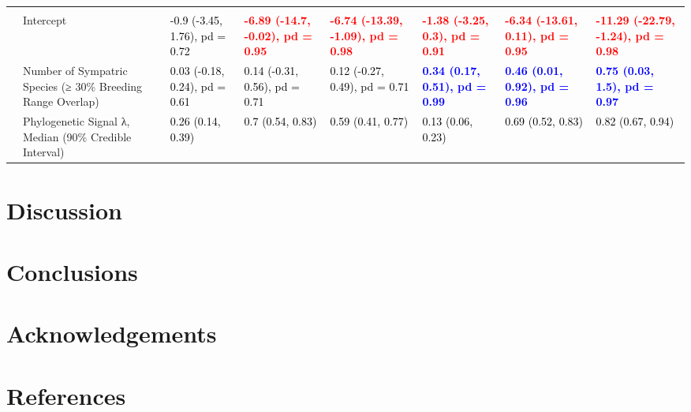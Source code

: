 \documentclass[
  a4paper,
]{article}
\begin{document}
\begin{landscape}
\begin{table}
{\begin{tabular}[t]{llllllll}
\addlinespace[0.3em]
\multicolumn{1}{l}{\textbf{Breeding Sympatry}}\\
\hspace{1em} & Intercept & \textcolor{black}{-0.9 (-3.45, 1.76), pd = 0.72} & \textcolor{red}{\textbf{-6.89 (-14.7, -0.02), pd = 0.95}} & \textcolor{red}{\textbf{-6.74 (-13.39, -1.09), pd = 0.98}} & \textcolor{red}{\textbf{-1.38 (-3.25, 0.3), pd = 0.91}} & \textcolor{red}{\textbf{-6.34 (-13.61, 0.11), pd = 0.95}} & \textcolor{red}{\textbf{-11.29 (-22.79, -1.24), pd = 0.98}}\\
 & Number of Sympatric Species 
\hspace{1em} (≥ 30\% Breeding Range Overlap) & \textcolor{black}{0.03 (-0.18, 0.24), pd = 0.61} & \textcolor{black}{0.14 (-0.31, 0.56), pd = 0.71} & \textcolor{black}{0.12 (-0.27, 0.49), pd = 0.71} & \textcolor{blue}{\textbf{0.34 (0.17, 0.51), pd = 0.99}} & \textcolor{blue}{\textbf{0.46 (0.01, 0.92), pd = 0.96}} & \textcolor{blue}{\textbf{0.75 (0.03, 1.5), pd = 0.97}}\\
\hspace{1em} & Phylogenetic Signal λ, Median (90\% Credible Interval) & \textcolor{black}{0.26 (0.14, 0.39)} & \textcolor{black}{0.7 (0.54, 0.83)} & \textcolor{black}{0.59 (0.41, 0.77)} & \textcolor{black}{0.13 (0.06, 0.23)} & \textcolor{black}{0.69 (0.52, 0.83)} & \textcolor{black}{0.82 (0.67, 0.94)}\\
\bottomrule
\end{tabular}}
\end{table}
\end{landscape}

\hypertarget{discussion}{%
\section{Discussion}\label{discussion}}

\hypertarget{conclusions}{%
\section{Conclusions}\label{conclusions}}

\hypertarget{acknowledgements}{%
\section{Acknowledgements}\label{acknowledgements}}

\hypertarget{references}{%
\section*{References}\label{references}}
\end{document}
